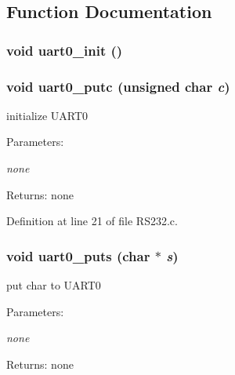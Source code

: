 \subsection{Function Documentation}
\subsubsection{\setlength{\rightskip}{0pt plus 5cm}void uart0\_\-init ()}\label{_r_s232_8h_03385fffebf4590cea86ae33b66d2ee4}


\subsubsection{\setlength{\rightskip}{0pt plus 5cm}void uart0\_\-putc (unsigned char {\em c})}\label{_r_s232_8h_a3e617e3f3c19057434cda6f1f113830}


initialize UART0 

\begin{Desc}
\item[Parameters:]
\begin{description}
\item[{\em none}]\end{description}
\end{Desc}
\begin{Desc}
\item[Returns:]none \end{Desc}


Definition at line 21 of file RS232.c.
\subsubsection{\setlength{\rightskip}{0pt plus 5cm}void uart0\_\-puts (char $\ast$ {\em s})}\label{_r_s232_8h_5e327f0e98dcd2b2c73a158ed89947c7}


put char to UART0 

\begin{Desc}
\item[Parameters:]
\begin{description}
\item[{\em none}]\end{description}
\end{Desc}
\begin{Desc}
\item[Returns:]none \end{Desc}


